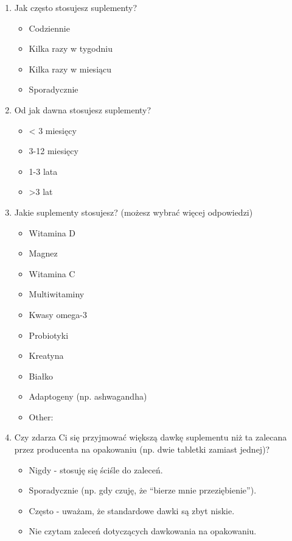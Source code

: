 \begin{appendices}
\begin{enumerate}
    \item Jak często stosujesz suplementy?
    \begin{itemize}
        \item Codziennie
        \item Kilka razy w tygodniu
        \item Kilka razy w miesiącu
        \item Sporadycznie
    \end{itemize}

    \item Od jak dawna stosujesz suplementy?
    \begin{itemize}
        \item < 3 miesięcy
        \item 3-12 miesięcy
        \item 1-3 lata
        \item >3 lat
    \end{itemize}

    \item Jakie suplementy stosujesz? (możesz wybrać więcej odpowiedzi)
    \begin{itemize}
        \item Witamina D
        \item Magnez
        \item Witamina C
        \item Multiwitaminy
        \item Kwasy omega-3
        \item Probiotyki
        \item Kreatyna
        \item Białko
        \item Adaptogeny (np. ashwagandha)
        \item Other:
    \end{itemize}

    \item Czy zdarza Ci się przyjmować większą dawkę suplementu niż ta zalecana przez producenta na opakowaniu (np. dwie tabletki zamiast jednej)?
    \begin{itemize}
        \item Nigdy - stosuję się ściśle do zaleceń.
        \item Sporadycznie (np. gdy czuję, że \enquote{bierze mnie przeziębienie}).
        \item Często - uważam, że standardowe dawki są zbyt niskie.
        \item Nie czytam zaleceń dotyczących dawkowania na opakowaniu.
    \end{itemize}


\end{enumerate}
\end{appendices}
